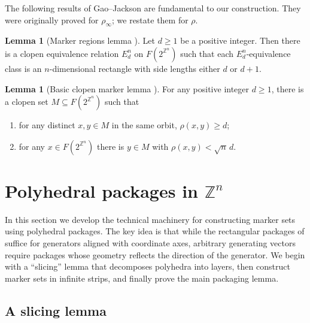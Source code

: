 \documentclass{amsart}
\theoremstyle{definition}
\newtheorem{lemma}[theorem]{Lemma}
\begin{document}
The following results of Gao--Jackson \cite{GJ15} are fundamental
to our construction. They were originally proved for $\rho_\infty$; we restate them for $\rho$.

\begin{lemma}[Marker regions lemma {\cite[Theorem 3.1]{GJ15}}]\label{lem:markerregions}
Let $d\geq 1$ be a positive integer. Then there is a clopen equivalence
relation $E_d^n$ on $F(2^{\mathbb{Z}^n})$ such that each $E_d^n$-equivalence
class is an $n$-dimensional rectangle with side lengths either $d$ or $d+1$.
\end{lemma}

\begin{lemma}[Basic clopen marker lemma {\cite[Lemma 2.1]{GJ15}}]\label{lem:basicmarker}
For any positive integer $d\geq 1$, there is a clopen set
$M\subseteq F(2^{\mathbb{Z}^n})$ such that
\begin{enumerate}
\item[(1)] for any distinct $x, y\in M$ in the same orbit,
$\rho(x,y)\geq d$;
\item[(2)] for any $x\in F(2^{\mathbb{Z}^n})$ there is $y\in M$ with
$\rho(x,y)< \sqrt{n}\,d$.
\end{enumerate}
\end{lemma}

\section{Polyhedral packages in $\mathbb{Z}^n$}\label{sec:packages}

In this section we develop the technical machinery for constructing
marker sets using polyhedral packages. The key idea is that while the
rectangular packages of \cite{GW25} suffice for generators aligned with
coordinate axes, arbitrary generating vectors require packages whose
geometry reflects the direction of the generator. We begin with a
``slicing'' lemma that decomposes polyhedra into layers, then construct
marker sets in infinite strips, and finally prove the main packaging lemma.

\subsection{A slicing lemma}
\end{document}
